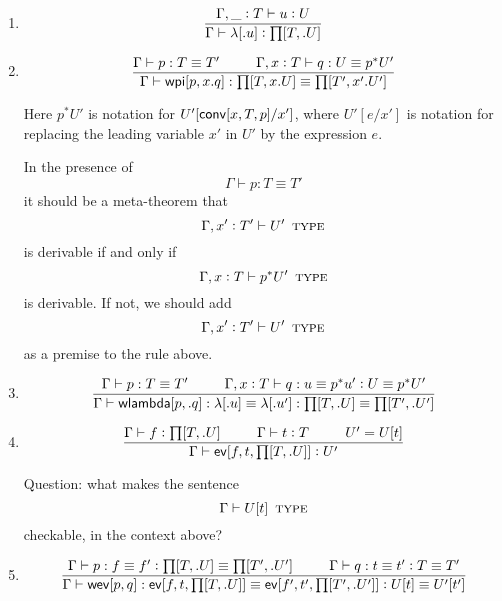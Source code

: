 \documentclass[11pt]{article}
\newcommand{\eqd}{\equiv}
\newcommand\spc{{\hskip 26pt}}
\newcommand{\ccolon}{\vcentcolon}
\newcommand{\ccheck}{\vcentcolon}            %
\newcommand{\csynth}{\vcentcolon\vcentcolon} %
\renewcommand{\csynth}{\ccheck}              %
\newcommand{\TYPE}{\mathop{\text{ \sc type}}}
\newcommand{\Okay}{\mathop{\text{ \sc okay}}}
\newcommand{\Context}{\vdash\Okay}
\renewcommand{\Context}{\vdash}
\newcommand{\ha}[2]{#1[#2]}
\newcommand{\annot}{{\sf annot}}
\newcommand{\haa}[2]{\ha\annot{#1,#2}}
\renewcommand{\haa}[2]{#1}
\newcommand{\conv}{{\sf conv}}
\newcommand{\ev}{{\sf ev}}
\newcommand{\weveq}{{\sf wev}}
\newcommand{\wlambda}{{\sf wlambda}}
\newcommand{\wpieq}{{\sf wpi}}
\newcommand{\var}{\char`_}
\newcommand{\defn}{\vcentcolon\equiv}
\begin{document}
\begin{enumerate}
Here $.U$ is notation for abstraction: binding an anonymous variable to the
expression $U$; we will also use the notation $x.U$ when binding a named
variable $x$, as in the following equivalent version of the same rule.

\[\frac{ \Gamma, x \ccolon T \vdash U\TYPE  }
       {\Gamma \vdash \ha\prod{T,x.U}\TYPE}\]

\item 
\[\frac{
  \Gamma, \var \ccolon T \vdash u \ccheck{U}
}{\Gamma \vdash \ha\lambda{.u} \ccheck{\ha\prod{T,.U}}}
\]

\item 
\[ \frac{ 
  \Gamma \vdash p:T \eqd T'  \spc
  \Gamma,  x \ccolon T \vdash q:U \eqd p^*U' 
  } {
  \Gamma \vdash \ha\wpieq{p,x.q}:\ha\prod{T,x.U}\eqd \ha\prod{T',x'.U'}
}\]

Here ${p}^*U'$ is notation for $U'[\haa {\ha\conv{x,T,p}} {T'}/x']$, where
$U'[e/x']$ is notation for replacing the leading variable $x'$ in $U'$ by the
expression $e$.

In the presence of 
\[\Gamma \vdash p:T \eqd T'  \]
it should be a
meta-theorem that 
\[\Gamma, x' \ccolon T' \vdash U' \TYPE \]
is derivable if and only if 
\[\Gamma, x \ccolon T \vdash p^* U' \TYPE \]
is derivable.  If not, we should add
\[  \Gamma, x' \ccolon T' \vdash U'  \TYPE  \]
as a premise to the rule above.

\item 
\[ \frac{ 
  \Gamma \vdash p:T \eqd T'  
  \spc
  \Gamma,  x \ccolon T \vdash q:u \eqd p^* u' \ccolon U \eqd p^*U'
  } {
  \Gamma \vdash \ha\wlambda{p,.q} : \ha\lambda{.u}\eqd \ha\lambda{.u'} : \ha\prod{T,.U} \eqd \ha\prod{T',.U'}
}\]

\item 
\[\frac{
  \Gamma \vdash f \ccheck{\ha\prod{T,.U}}
  \spc 
  \Gamma \vdash t \ccheck{T}
  \spc
  U' = U[\haa t T] 
}{
  \Gamma \vdash \ha \ev{f,t,{\ha\prod{T,.U}}} \csynth U'
}\]


Question: what makes the sentence 
\[ \Gamma \vdash U[\haa t T] \TYPE \]
checkable, in the context above?

\item 
\[\frac{
   \Gamma \vdash p : f \eqd f' \ccolon {\ha\prod{T,.U}} \eqd {\ha\prod{T',.U'}} 
   \spc 
   \Gamma \vdash q : t \eqd t' \ccolon T \eqd T'
   }{
   \Gamma \vdash \ha\weveq{p,q} : \ha\ev{f,t,{\ha\prod{T,.U}}} \eqd \ha\ev{f',t',{\ha\prod{T',.U'}}} \ccolon U[\haa t T] \eqd U'[\haa {t'} {T'}]
  }\]


\end{enumerate}
\end{document}
